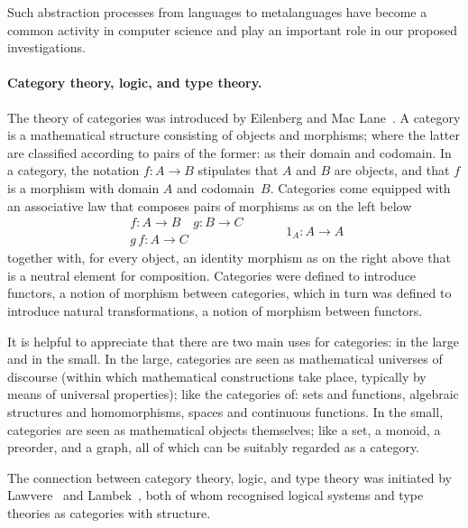 \documentclass[11pt,twocolumn]{article}
\begin{document}
Such abstraction processes from languages to metalanguages have become a
common activity in computer science and play an important role in our
proposed investigations.  

\paragraph{Category theory, logic, and type theory.}

The theory of categories was introduced by Eilenberg and Mac
Lane~\cite{EilenbergMacLane}.  A category is a mathematical structure
consisting of objects and morphisms; where the latter are classified
according to pairs of the former: as their domain and codomain.  In a
category, the notation $f:A\to B$ stipulates that $A$ and $B$ are objects,
and that $f$ is a morphism with domain $A$ and codomain~$B$.  Categories
come equipped with an associative law that composes pairs of morphisms as
on the left below
\begin{equation}\label{Category}
  \begin{array}{c}
  f:A\to B\quad g:B\to C
  \\ \hline
  g\,f:A\to C
\end{array}
\quad\qquad
1_A:A\to A
\end{equation}
together with, for every object, an identity morphism as on the right above
that is a neutral element for composition.  Categories were defined to
introduce functors, a notion of morphism between categories, which in turn was
defined to introduce natural transformations, a notion of morphism between
functors.

It is helpful to appreciate that there are two main uses for categories: in the
large and in the small.  In the large, categories are seen as mathematical
universes of discourse (within which mathematical constructions take place,
typically by means of universal properties); like the categories of: sets and
functions, algebraic structures and homomorphisms, spaces and continuous
functions.  In the small, categories are seen as mathematical objects
themselves; like a set, a monoid, a preorder, and a graph, all of which can
be suitably regarded as a category.

The connection between category theory, logic, and type theory was
initiated by Lawvere~\cite{LawvereThesis} and Lambek~\cite{LambekI}, both
of whom recognised logical systems and type theories as categories with
structure.  
\end{document}

